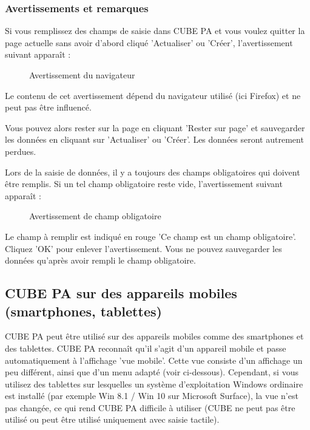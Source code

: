 \subsubsection{Avertissements et remarques}
Si vous remplissez des champs de saisie dans CUBE PA et vous voulez quitter la page actuelle sans avoir d'abord cliqué 'Actualiser' ou 'Créer', l'avertissement suivant apparaît : 

\begin{figure}[H]
\caption{Avertissement du navigateur}
\end{figure}
\begin{small}
Le contenu de cet avertissement dépend du navigateur utilisé (ici Firefox) et ne peut pas être influencé.
\end{small}

\vspace{\baselineskip}

Vous pouvez alors rester sur la page en cliquant 'Rester sur page' et sauvegarder les données en cliquant sur 'Actualiser' ou 'Créer'. Les données seront autrement perdues.

\vspace{\baselineskip}

Lors de la saisie de données, il y a toujours des champs obligatoires qui doivent être remplis. Si un tel champ obligatoire reste vide, l'avertissement suivant apparaît :

\begin{figure}[H]
\caption{Avertissement de champ obligatoire}
\end{figure}

Le champ à remplir est indiqué en rouge 'Ce champ est un champ obligatoire'. Cliquez 'OK' pour enlever l'avertissement. Vous ne pouvez sauvegarder les données qu'après avoir rempli le champ obligatoire. 


\subsection{CUBE PA sur des appareils mobiles (smartphones, tablettes)}

CUBE PA peut être utilisé sur des appareils mobiles comme des smartphones et des tablettes. CUBE PA reconnaît qu'il s'agit d'un appareil mobile et passe automatiquement à l'affichage 'vue mobile'. Cette vue consiste d'un affichage un peu différent, ainsi que d'un menu adapté (voir ci-dessous). Cependant, si vous utilisez des tablettes sur lesquelles un système d'exploitation Windows ordinaire est installé (par exemple Win 8.1 / Win 10 sur Microsoft Surface), la vue n'est pas changée, ce qui rend CUBE PA difficile à utiliser (CUBE ne peut pas être utilisé ou peut être utilisé uniquement avec saisie tactile).


